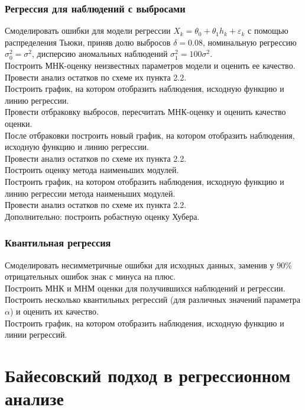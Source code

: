 \documentclass[a4paper,12pt]{article}
\begin{document}
\subsubsection{Регрессия для наблюдений с выбросами}

Смоделировать ошибки для модели регрессии $X_k = \theta_0 + \theta_1 h_k + \varepsilon_k$ с помощью распределения Тьюки, приняв долю выбросов $\delta = 0.08$, номинальную регрессию $\sigma_0^2 = \sigma^2$, дисперсию аномальных наблюдений $\sigma_1^2 = 100\sigma^2$.\\
Построить МНК-оценку неизвестных параметров модели и оценить ее качество.\\
Провести анализ остатков по схеме их пункта 2.2.\\
Построить график, на котором отобразить наблюдения, исходную функцию и линию регрессии.\\
Провести отбраковку выбросов, пересчитать МНК-оценку и оценить качество оценки.\\
После отбраковки построить новый график, на котором отобразить наблюдения, исходную функцию и линию регрессии.\\
Провести анализ остатков по схеме их пункта 2.2.\\
Построить оценку метода наименьших модулей.\\
Построить график, на котором отобразить наблюдения, исходную функцию и линию регрессии метода наименьших модулей.\\
Провести анализ остатков по схеме их пункта 2.2.\\
Дополнительно: построить робастную оценку Хубера.



\subsubsection{Квантильная регрессия}

Смоделировать несимметричные ошибки для исходных данных, заменив у $90\%$ отрицательных ошибок знак с минуса на плюс.\\
Построить МНК и МНМ оценки для получившихся наблюдений и регрессии.\\
Построить несколько квантильных регрессий (для различных значений параметра $\alpha$) и оценить их качество.\\
Построить график, на котором отобразить наблюдения, исходную функцию и линии регрессий.\\


\section{Байесовский подход в регрессионном анализе}
\end{document}
